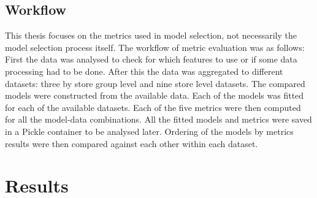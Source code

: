 \documentclass[english, 12pt, a4paper, sci, utf8, a-1b, online]{aaltothesis}
\begin{document}
\subsection{Workflow}

This thesis focuses on the metrics used in model selection, not necessarily the model selection process itself. The workflow of metric evaluation was as follows: First the data was analysed to check for which features to use or if some data processing had to be done. After this the data was aggregated to different datasets: three by store group level and nine store level datasets. The compared models were constructed from the available data. Each of the models was fitted for each of the available datasets. Each of the five metrics were then computed for all the model-data combinations. All the fitted models and metrics were saved in a Pickle container to be analysed later. Ordering of the models by metrics results were then compared against each other within each dataset.













\section{Results}


\end{document}
